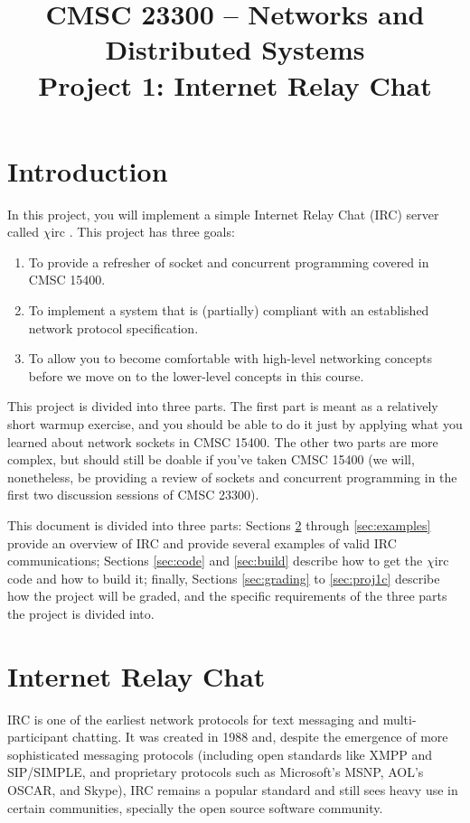 \documentclass[10pt]{article}
\title{CMSC 23300 -- Networks and Distributed Systems\\{\large Project 1: Internet Relay Chat}}
\date{}
\newcommand{\chirc}{$\chi$\textsf{irc} }
\begin{document}
\pagestyle{empty}
\maketitle

\section{Introduction}

In this project, you will implement a simple Internet Relay Chat (IRC) server called \chirc. This project has three goals:

\begin{enumerate}
 \item To provide a refresher of socket and concurrent programming covered in CMSC 15400.
 \item To implement a system that is (partially) compliant with an established network protocol specification.
 \item To allow you to become comfortable with high-level networking concepts before we move on to the lower-level concepts in this course.
\end{enumerate}

This project is divided into three parts. The first part is meant as a relatively short warmup exercise, and you should be able to do it just by applying what you learned about network sockets in CMSC 15400. The other two parts are more complex, but should still be doable if you've taken CMSC 15400 (we will, nonetheless, be providing a review of sockets and concurrent programming in the first two discussion sessions of CMSC 23300).

This document is divided into three parts: Sections \ref{sec:irc} through \ref{sec:examples} provide an overview of IRC and provide several examples of valid IRC communications; Sections \ref{sec:code} and \ref{sec:build} describe how to get the \chirc code and how to build it; finally, Sections \ref{sec:grading} to \ref{sec:proj1c} describe how the project will be graded, and the specific requirements of the three parts the project is divided into.

\section{Internet Relay Chat}
\label{sec:irc}

IRC is one of the earliest network protocols for text messaging and multi-participant chatting. It was created in 1988 and, despite the emergence of more sophisticated messaging protocols (including open standards like XMPP and SIP/SIMPLE, and proprietary protocols such as Microsoft's MSNP, AOL's OSCAR, and Skype), IRC remains a popular standard and still sees heavy use in certain communities, specially the open source software community.
\end{document}
